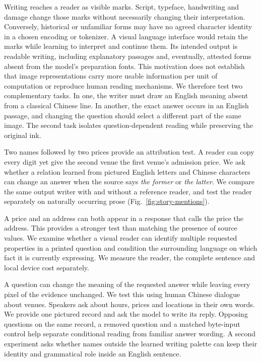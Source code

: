 Writing reaches a reader as visible marks. Script, typeface, handwriting and
damage change those marks without necessarily changing their interpretation.
Conversely, historical or unfamiliar forms may have no agreed character
identity in a chosen encoding or tokenizer. A visual language interface would
retain the marks while learning to interpret and continue them. Its intended
output is readable writing, including explanatory passages and, eventually,
attested forms absent from the model's preparation fonts. This motivation does
not establish that image representations carry more usable information per
unit of computation or reproduce human reading mechanisms. We therefore test two complementary tasks. In one, the writer must draw an English meaning absent from a classical Chinese line. In another, the exact answer occurs in an English passage, and changing the question should select a different part of the same image. The second task isolates question-dependent reading while preserving the original ink.

Two names followed by two prices provide an attribution test. A reader can copy every digit yet give the second venue the first venue's admission price. We ask whether a relation learned from pictured English letters and Chinese characters can change an answer when the source says \emph{the former} or \emph{the latter}. We compare the same output writer with and without a reference reader, and test the reader separately on naturally occurring prose (Fig.~\ref{fig:story-mentions}).

A price and an address can both appear in a response that calls the price the address. This provides a stronger test than matching the presence of source values. We examine whether a visual reader can identify multiple requested properties in a printed question and condition the surrounding language on which fact it is currently expressing. We measure the reader, the complete sentence and local device cost separately.

A question can change the meaning of the requested answer while leaving every pixel of the evidence unchanged. We test this using human Chinese dialogue about venues. Speakers ask about hours, prices and locations in their own words. We provide one pictured record and ask the model to write its reply. Opposing questions on the same record, a removed question and a matched byte-input control help separate conditional reading from familiar answer wording. A second experiment asks whether names outside the learned writing palette can keep their identity and grammatical role inside an English sentence.

